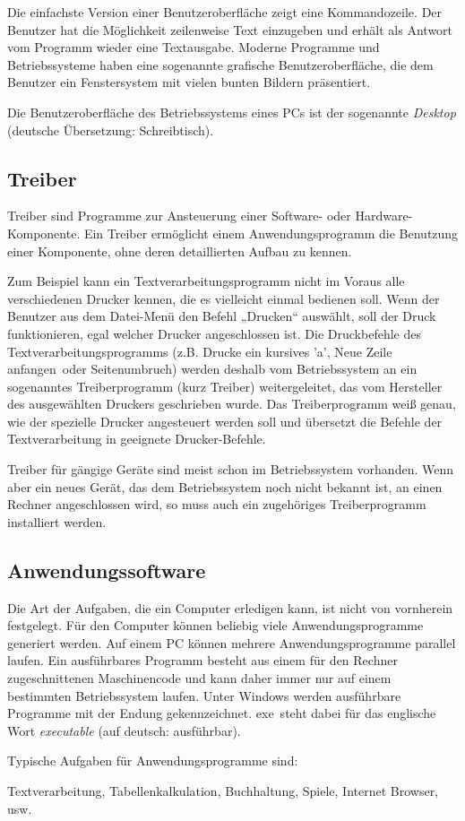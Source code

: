 Die einfachste Version einer Benutzeroberfläche zeigt eine Kommandozeile. Der
Benutzer hat die Möglichkeit zeilenweise Text einzugeben und erhält als Antwort
vom Programm wieder eine Textausgabe. Moderne Programme und Betriebssysteme
haben eine sogenannte grafische Benutzeroberfläche, die dem Benutzer ein
Fenstersystem mit vielen bunten Bildern präsentiert.

Die Benutzeroberfläche des Betriebssystems eines PCs ist der sogenannte
\emph{Desktop} (deutsche Übersetzung: \glqq Schreibtisch\grqq ).


\subsection{Treiber}

Treiber sind Programme zur Ansteuerung einer Software- oder
Hardware-Komponente. Ein Treiber ermöglicht einem Anwendungsprogramm die
Benutzung einer Komponente, ohne deren detaillierten Aufbau zu kennen.

Zum Beispiel kann ein Textverarbeitungsprogramm nicht im Voraus alle
verschiedenen Drucker kennen, die es vielleicht einmal bedienen soll. Wenn der
Benutzer aus dem Datei-Menü den Befehl „Drucken“ auswählt, soll der Druck
funktionieren, egal welcher Drucker angeschlossen ist. Die Druckbefehle des
Textverarbeitungsprogramms (z.B. \glqq Drucke ein kursives 'a'\grqq , \glqq Neue
Zeile anfangen\grqq\ oder \glqq Seitenumbruch\grqq ) werden deshalb vom
Betriebssystem an ein sogenanntes Treiberprogramm (kurz Treiber) weitergeleitet, das vom Hersteller
des ausgewählten Druckers geschrieben wurde. Das Treiberprogramm weiß genau,
wie der spezielle Drucker angesteuert werden soll und übersetzt die Befehle der
Textverarbeitung in geeignete Drucker-Befehle.

Treiber für gängige Geräte sind meist schon im Betriebssystem vorhanden. Wenn
aber ein neues Gerät, das dem Betriebssystem noch nicht bekannt ist, an einen
Rechner angeschlossen wird, so muss auch ein zugehöriges Treiberprogramm
installiert werden.


\subsection{Anwendungssoftware}

Die Art der Aufgaben, die ein Computer erledigen kann, ist nicht von
vornherein festgelegt. Für den Computer können beliebig viele
Anwendungsprogramme generiert werden. Auf einem PC können mehrere
Anwendungsprogramme parallel laufen. Ein ausführbares Programm besteht aus
einem für den Rechner zugeschnittenen Maschinencode und kann daher immer nur
auf einem bestimmten Betriebssystem laufen. Unter Windows werden ausführbare
Programme mit der Endung  gekennzeichnet. \glqq exe\grqq\ steht
dabei für das englische Wort \emph{executable} (auf deutsch: ausführbar).

Typische Aufgaben für Anwendungsprogramme sind:

Textverarbeitung, Tabellenkalkulation, Buchhaltung, Spiele, Internet Browser,
usw.